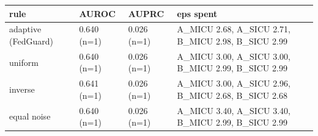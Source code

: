 \begin{tabular}{llll}
\toprule
rule & AUROC & AUPRC & eps spent \\
\midrule
adaptive (FedGuard) & 0.640 (n=1) & 0.026 (n=1) & A\_MICU 2.68, A\_SICU 2.71, B\_MICU 2.98, B\_SICU 2.99 \\
uniform & 0.640 (n=1) & 0.026 (n=1) & A\_MICU 3.00, A\_SICU 3.00, B\_MICU 2.99, B\_SICU 2.99 \\
inverse & 0.641 (n=1) & 0.026 (n=1) & A\_MICU 3.00, A\_SICU 2.96, B\_MICU 2.68, B\_SICU 2.68 \\
equal noise & 0.640 (n=1) & 0.026 (n=1) & A\_MICU 3.40, A\_SICU 3.40, B\_MICU 2.99, B\_SICU 2.99 \\
\bottomrule
\end{tabular}
